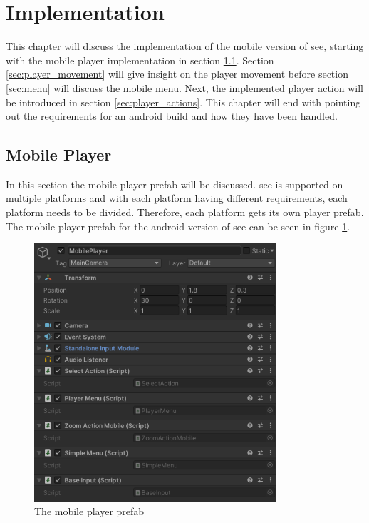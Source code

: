 \section{Implementation}
\label{section:implementation}

This chapter will discuss the implementation of the mobile version of \gls{see}, starting with the mobile player implementation in section \ref{sec:player}.
Section \ref{sec:player_movement} will give insight on the player movement before section \ref{sec:menu} will discuss the mobile menu.
Next, the implemented player action will be introduced in section \ref{sec:player_actions}.
This chapter will end with pointing out the requirements for an \gls{android} build and how they have been handled.
\subsection{Mobile Player}
\label{sec:player}
In this section the mobile player \gls{prefab} will be discussed. 
\gls{see} is supported on multiple platforms and with each platform having different requirements, each platform needs to be divided.
Therefore, each platform gets its own player \gls{prefab}.
The mobile player prefab for the \gls{android} version of \gls{see} can be seen in figure \ref{fig:prefab}.

\begin{figure}[htb]
    \centering
    \includegraphics[width=0.8\textwidth]{Implementation/img/mobile_player.png}
    \caption{The mobile player \gls{prefab}}\label{fig:prefab}
\end{figure}

